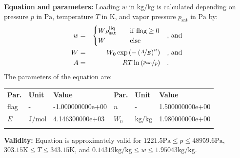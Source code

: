 \textbf{Equation and parameters:}
\newline
%
Loading $w$ in $\si{\kilogram\per\kilogram}$ is calculated depending on pressure $p$ in $\si{\pascal}$, temperature $T$ in $\si{\kelvin}$, and vapor pressure $p_\mathrm{sat}$ in $\si{\pascal}$ by:
%
\begin{equation*}
\begin{split}
w &=& \begin{cases} W \rho_\mathrm{sat}^{\mathrm{liq}} & \quad \text{if flag} \geq 0 \\ W & \quad \text{else} \end{cases} & \quad\text{, and} \\
W &=& W_0 \exp \left( - \left( \nicefrac{A}{E} \right) ^{n} \right) & \quad\text{, and} \\
A &=& R T \ln \left( \nicefrac{p_\mathrm{sat}}{p} \right) & \quad\text{.} \\
\end{split}
\end{equation*}
%
The parameters of the equation are:
%
\begin{longtable}[l]{lll|lll}
\toprule
\addlinespace
\textbf{Par.} & \textbf{Unit} & \textbf{Value} &	\textbf{Par.} & \textbf{Unit} & \textbf{Value} \\
\addlinespace
\midrule
\endhead

\bottomrule
\endfoot
\bottomrule
\endlastfoot
\addlinespace

flag & - & -1.000000000e+00 & $n$ & - & 1.500000000e+00 \\
$E$ & $\si{\joule\per\mole}$ & 4.146300000e+03 & $W_0$ & $\si{\kilogram\per\kilogram}$ & 1.980000000e+00 \\

\addlinespace\end{longtable}

\textbf{Validity:}
\newline
Equation is approximately valid for $1221.5 \si{\pascal} \leq p \leq 48959.6 \si{\pascal}$,  $303.15 \si{\kelvin} \leq T \leq 343.15 \si{\kelvin}$, and $0.14319 \si{\kilogram\per\kilogram} \leq w \leq 1.95043 \si{\kilogram\per\kilogram}$.
\newline

